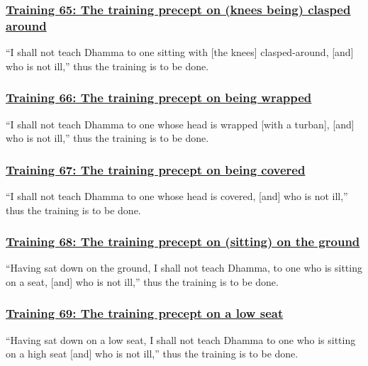 \subsubsection*{\hyperref[sekh65]{Training 65: The training precept on (knees being) clasped around}}
\label{training65}
``I shall not teach Dhamma to one sitting with [the knees] clasped-around, [and] who is not ill,'' thus the training is to be done.



\subsubsection*{\hyperref[sekh66]{Training 66: The training precept on being wrapped}}
\label{training66}
``I shall not teach Dhamma to one whose head is wrapped [with a turban], [and] who is not ill,'' thus the training is to be done.



\subsubsection*{\hyperref[sekh67]{Training 67: The training precept on being covered}}
\label{training67}
``I shall not teach Dhamma to one whose head is covered, [and] who is not ill,'' thus the training is to be done.



\subsubsection*{\hyperref[sekh68]{Training 68: The training precept on (sitting) on the ground}}
\label{training68}
``Having sat down on the ground, I shall not teach Dhamma, to one who is sitting on a seat, [and] who is not ill,'' thus the training is to be done.



\subsubsection*{\hyperref[sekh69]{Training 69: The training precept on a low seat}}
\label{training69}
``Having sat down on a low seat, I shall not teach Dhamma to one who is sitting on a high seat [and] who is not ill,'' thus the training is to be done.



